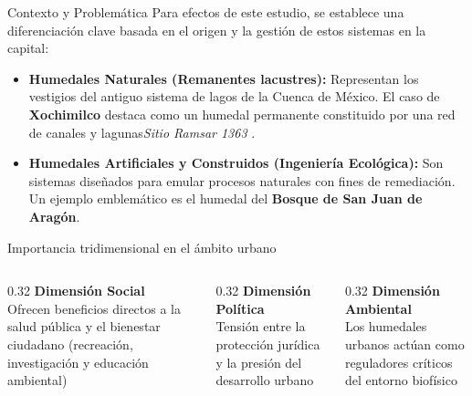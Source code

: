 \begin{frame}{Contexto y Problemática}
  Para efectos de este estudio, se establece una diferenciación clave basada en el origen y la gestión de estos sistemas en la capital:
  \begin{itemize}
    \item \textbf{Humedales Naturales (Remanentes lacustres):} Representan los vestigios del antiguo sistema de lagos de la Cuenca de México.
    El caso de \textbf{Xochimilco} destaca como un humedal permanente constituido por una red de canales y lagunas\textit{Sitio Ramsar 1363} \cite{paot2006xochimilco}.
    \item \textbf{Humedales Artificiales y Construidos (Ingeniería Ecológica):} Son sistemas diseñados para emular procesos naturales con fines 
    de remediación. Un ejemplo emblemático es el humedal del \textbf{Bosque de San Juan de Aragón}.
  \end{itemize}
\end{frame}

\begin{frame}{Importancia tridimensional en el ámbito urbano}
  \vspace{0.4cm}
  \begin{columns}[T]
    \begin{column}{0.32\textwidth}
      \centering
      {\color{ColorPrincipal}\Large\textbf{Dimensión Social}}\\[0.1cm]
      {\small Ofrecen beneficios directos a la salud pública y el bienestar ciudadano}
      {\small (recreación, investigación y educación ambiental)}
    \end{column}
    \begin{column}{0.32\textwidth}
      \centering
      {\color{ColorPrincipal}\Large\textbf{Dimensión Política}}\\[0.1cm]
      {\small Tensión entre la protección jurídica y la presión del desarrollo urbano}
    \end{column}
    \begin{column}{0.32\textwidth}
      \centering
      {\color{ColorPrincipal}\Large\textbf{Dimensión Ambiental}}\\[0.1cm]
      {\small Los humedales urbanos actúan como reguladores críticos del entorno biofísico}
    \end{column}
  \end{columns}
\end{frame}
